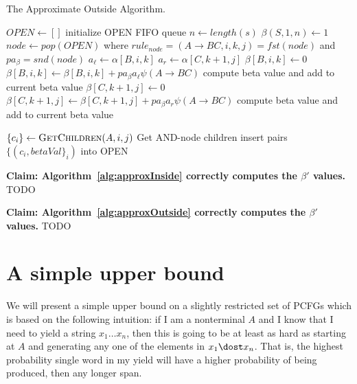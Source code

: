 \documentclass{article}
\begin{document}
\begin{algorithm}
\caption{The Approximate Outside Algorithm.\label{alg:approxOutside}}
\begin{algorithmic}[2]
  \State $OPEN \leftarrow []$ \Comment initialize OPEN FIFO queue
  \State $n \leftarrow length(s)$
  \State $\beta(S, 1, n) \leftarrow 1$
  \State {}
    \State $node \leftarrow pop(OPEN)$ where $rule_{node} = (A \rightarrow B C, i, k, j) = fst(node)$ and $pa_\beta= snd(node)$
    \State $a_\ell \leftarrow \alpha[B, i, k]$
    \State $a_r \leftarrow \alpha[C, k+1, j]$
         $\beta[B, i, k] \leftarrow 0$
      \EndIf
      \State $\beta[B, i, k] \leftarrow \beta[B, i, k] + pa_\beta a_\ell \psi(A \rightarrow B C)$ \Comment compute beta value and add to current beta value 
      \State {}
    \EndIf
         $\beta[C, k+1, j] \leftarrow 0$
      \EndIf
      \State $\beta[C, k+1, j] \leftarrow \beta[C, k+1, j] + pa_\beta a_r \psi(A \rightarrow B C)$ \Comment compute beta value and add to current beta value 
      \State {}
    \EndIf
  \EndWhile  
\EndProcedure

\Statex
{}
  \State $\{c_i\}\leftarrow \Call{GetChildren}{A, i, j}$ \Comment Get AND-node children
  \State insert pairs $\{(c_i, betaVal\}_i)$ into OPEN
\EndProcedure
\end{algorithmic}
\end{algorithm}

\noindent \textbf{Claim: Algorithm~\ref{alg:approxInside} correctly computes the $\beta'$ values.}
\noindent TODO

\noindent \textbf{Claim: Algorithm~\ref{alg:approxOutside} correctly computes the $\beta'$ values.}
\noindent TODO


\section{A simple upper bound}
We will present a simple upper bound on a slightly restricted set of
PCFGs which is based on the following intuition: if I am a nonterminal
$A$ and I know that I need to yield a string $x_1 \dots x_n$, then
this is going to be at least as hard as starting at $A$ and generating
any one of the elements in $x_1 \dost x_n$. That is, the highest
probability single word in my yield will have a higher probability of
being produced, then any longer span. 
\end{document}
